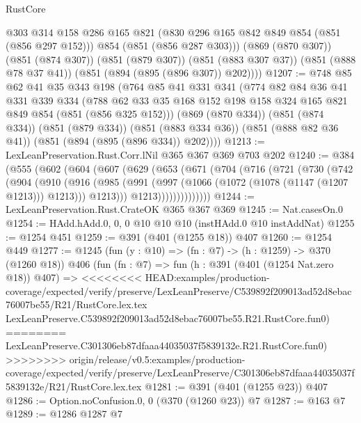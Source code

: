 \begin{lexlean}{RustCore}
\begin{coremodule}
{\begin{coremodule}
{{{{{          @303
          @314
          @158
          @286
          @165
          @821
          (@830 @296 @165 @842 @849 @854 (@851 (@856 @297 @152)))
          @854
          (@851 (@856 @287 @303)))
        (@869 (@870 @307))
        (@851 (@874 @307))
        (@851 (@879 @307))
        (@851 (@883 @307 @37))
        (@851 (@888 @78 @37 @41))
        (@851 (@894 (@895 (@896 @307)) @202))))
@1207 := @748
    @85
    @62
    @41
    @35
    @343
    @198
    (@764
      @85
      @41
      @331
      @341
      (@774
        @82
        @84
        @36
        @41
        @331
        @339
        @334
        (@788 @62 @33 @35 @168 @152 @198 @158 @324 @165 @821 @849 @854 (@851 (@856 @325 @152)))
        (@869 (@870 @334))
        (@851 (@874 @334))
        (@851 (@879 @334))
        (@851 (@883 @334 @36))
        (@851 (@888 @82 @36 @41))
        (@851 (@894 (@895 (@896 @334)) @202))))
@1213 := LexLeanPreservation.Rust.Corr.lNil @365 @367 @369 @703 @202
@1240 := @384
    (@555
      (@602
        (@604
          (@607
            (@629
              (@653
                (@671
                  (@704
                    (@716
                      (@721
                        (@730
                          (@742
                            (@904
                              (@910
                                (@916
                                  (@985
                                    (@991
                                      (@997 (@1066 (@1072 (@1078 (@1147 (@1207 @1213))) @1213)))
                                      @1213)))
                                @1213))))))))))))))
@1244 := LexLeanPreservation.Rust.CrateOK @365 @367 @369
@1245 := Nat.casesOn.{0}
@1254 := HAdd.hAdd.{0, 0, 0} @10 @10 @10 (instHAdd.{0} @10 instAddNat)
@1255 := @1254 @451
@1259 := @391 (@401 (@1255 @18)) @407
@1260 := @1254 @449
@1277 := @1245
    (fun (y : @10) => (fn : @7) -> (h : @1259) -> @370 (@1260 @18))
    @406
    (fun (fn : @7) =>
    fun (h : @391 (@401 (@1254 Nat.zero @18)) @407) =>
<<<<<<<< HEAD:examples/production-coverage/expected/verify/preserve/LexLeanPreserve/C539892f209013ad52d8ebac76007be55/R21/RustCore.lex.tex
    LexLeanPreserve.C539892f209013ad52d8ebac76007be55.R21.RustCore.fun0)
========
    LexLeanPreserve.C301306eb87dfaaa44035037f5839132e.R21.RustCore.fun0)
>>>>>>>> origin/release/v0.5:examples/production-coverage/expected/verify/preserve/LexLeanPreserve/C301306eb87dfaaa44035037f5839132e/R21/RustCore.lex.tex
@1281 := @391 (@401 (@1255 @23)) @407
@1286 := Option.noConfusion.{0, 0} (@370 (@1260 @23)) @7
@1287 := @163 @7
@1289 := @1286 @1287 @7
}}}}}
\end{coremodule}}
\end{coremodule}
\end{lexlean}
